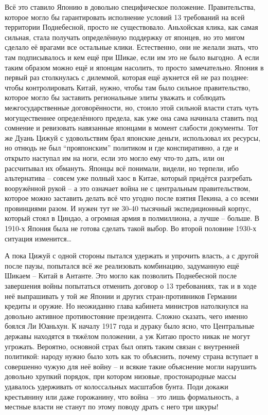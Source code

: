 Всё это ставило Японию в довольно специфическое положение. Правительства, которое могло бы гарантировать исполнение условий 13 требований на всей территории Поднебесной, просто не существовало. Аньхойская клика, как самая сильная, стала получать определённую поддержку от японцев, но это мигом сделало её врагами все остальные клики. Естественно, они не желали знать, что там подписывалось и кем ещё при Шикае, если им это не было выгодно. А если таким образом можно ещё и японцам насолить, то просто замечательно. Япония в первый раз столкнулась с дилеммой, которая ещё аукнется ей не раз позднее: чтобы контролировать Китай, нужно, чтобы там было сильное правительство, которое могло бы заставить региональные элиты уважать и соблюдать межгосударственные договорённости, но, стоило этой сильной власти стать чуть могущественнее определённого предела, как уже она сама начинала ставить под сомнение и ревизовать навязанные японцами в момент слабости документы. Тот же Дуань Цижуй с удовольствим брал японские деньги, использовал их ресурсы, но отнюдь не был “прояпонским” политиком и где конспиративно, а где и открыто наступал им на ноги, если это могло ему что-то дать, или он рассчитывал их обмануть. Японцы всё понимали, видели, но терпели, ибо альтернатива – совсем уже полный хаос в Китае, который придётся разгребать вооружённой рукой – а это означает война не с центральным правительством, которое можно заставить делать всё что угодно после взятия Пекина, а со всеми провинциями разом. И нужен тут не 30-40 тысячный экспедиционный корпус, который стоял в Циндао, а огромная армия в полмиллиона, а лучше – больше. В 1910-х Япония была не готова сделать такой выбор. Во второй половине 1930-х ситуация изменится…

А пока Цижуй с одной стороны пытался удержать и упрочить власть, а с другой после паузы, попытался всё же реализовать комбинацию, задуманную ещё Шикаем – Китай в Антанте. Это могло как позволить Поднебесной после завершения войны попытаться отменить договор о 13 требованиях, так и в ходе неё выпрашивать у той же Японии и других стран-противников Германии кредиты и оружие. Но неожиданно глава кабинета министров натолкнулся на довольно активное противостояние президента. Сложно сказать, чего именно боялся Ли Юаньхун. К началу 1917 года и дураку было ясно, что Центральные державы находятся в тяжёлом положении, а уж Китаю просто никак не могут угрожать. Вероятно, основной страх был опять таким связан с внутренней политикой: народу нужно было хоть как то объяснить, почему страна вступает в совершенно чужую для неё войну – и всякие такие объяснение могли нарушить довольно хрупкий порядок, при котором низовые, простонародные массы удавалось удерживать от колоссальных масштабов бунта. Поди докажи крестьянину или даже горожанину, что война – это лишь формальность, а местные власти не станут по этому поводу драть с него три шкуры!

